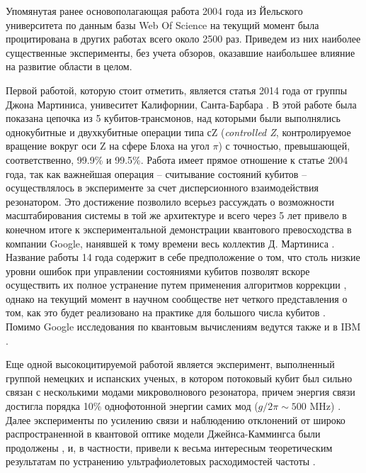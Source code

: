 \documentclass[14pt, a4paper]{extreport}
\numberwithin{equation}{section}
\begin{document}
Упомянутая ранее основополагающая работа 2004 года из Йельского университета \cite{wallraff2004strong} по данным базы Web Of Science на текущий момент была процитирована в других работах всего около 2500 раз. Приведем из них наиболее существенные эксперименты, без учета обзоров, оказавшие наибольшее влияние на развитие области в целом. 

Первой работой, которую стоит отметить, является статья 2014 года от группы Джона Мартиниса, унивеситет Калифорнии, Санта-Барбара \cite{barends2014superconducting}. В этой работе была показана цепочка из 5 кубитов-трансмонов, над которыми были выполнялись однокубитные и двухкубитные операции типа сZ (\textit{controlled Z}, контролируемое вращение вокруг оси Z на сфере Блоха на угол $\pi$) с точностью, превышающей, соответственно, 99.9\% и 99.5\%. Работа имеет прямое отношение к статье 2004 года, так как важнейшая операция -- считывание состояний кубитов -- осуществлялось в эксперименте за счет дисперсионного взаимодействия резонатором. Это достижение позволило всерьез рассуждать о возможности масштабирования системы в той же архитектуре и всего через 5 лет привело в конечном итоге к экспериментальной демонстрации квантового превосходства в компании Google, нанявшей к тому времени весь коллектив Д. Мартиниса \cite{arute2019quantum}. Название работы 14 года содержит в себе предположение о том, что столь низкие уровни ошибок при управлении состояниями кубитов позволят вскоре осуществить их полное устранение путем применения алгоритмов коррекции \cite{shor1995scheme, fowler2012surface}, однако на текущий момент в научном сообществе нет четкого представления о том, как это будет реализовано на практике для большого числа кубитов \cite{kjaergaard2020superconducting}. Помимо Google исследования по квантовым вычислениям ведутся также и в IBM \cite{corcoles2015demonstration}.

Еще одной высокоцитируемой работой является эксперимент, выполненный группой немецких и испанских ученых, в котором потоковый кубит был сильно связан с несколькими модами микроволнового резонатора, причем энергия связи достигла порядка 10\% однофотонной энергии самих мод ($g/2\pi \sim 500$ MHz) \cite{niemczyk2010circuit}. Далее эксперименты по усилению связи и наблюдению отклонений от широко распространенной в квантовой оптике модели Джейнса-Каммингса были продолжены \cite{bosman2017multi}, и, в частности, привели к весьма интересным теоретическим результатам по устранению ультрафиолетовых расходимостей частоты \cite{gely2017convergence, malekakhlagh2017cutoff, parra2018quantum}.
\end{document}
